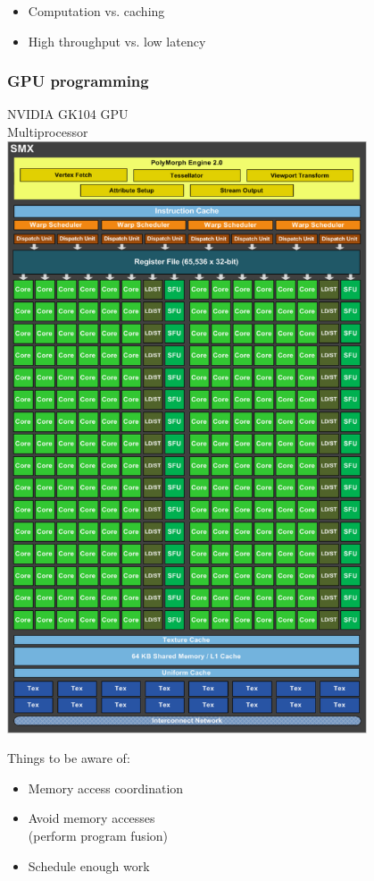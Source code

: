 \documentclass{beamer}
\begin{document}
\begin{frame}[t]
\begin{minipage}[t]{0.55\linewidth}
    \begin{itemize}
    \item Computation vs. caching
    \item High throughput vs. low latency
    \end{itemize}
  \end{minipage}
\end{frame}

\begin{frame}[t]
  \frametitle{GPU programming}
  \vspace{0.5cm}
   \begin{minipage}[t]{0.40\linewidth}
    NVIDIA GK104 GPU\\
    Multiprocessor\vspace{0.15cm}\\
    \includegraphics[width=0.8\textwidth]{graphics/nvidia_kepler_gk104_sm.pdf}
  \end{minipage}
  \begin{minipage}[t]{0.50\linewidth}
    Things to be aware of:
    \begin{itemize}
    \item<1-> Memory access coordination
    \item<2-> Avoid memory accesses\\ (perform program fusion)
    \item<3-> Schedule enough work
    \end{itemize}
  \end{minipage}
\end{frame}
\end{document}
